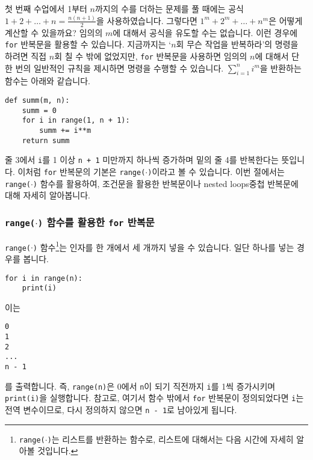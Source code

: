 \documentclass[../main.tex]{subfiles}
\begin{document}
첫 번째 수업에서 1부터 $n$까지의 수를 더하는 문제를 풀 때에는 공식
$1 + 2 + \dots + n = \frac{n(n + 1)}{2}$을 사용하였습니다.
그렇다면 $1^m + 2^m + \dots + n^m$은 어떻게 계산할 수 있을까요?
임의의 $m$에 대해서 공식을 유도할 수는 없습니다.
이런 경우에 \texttt{for} 반복문을 활용할 수 있습니다.
지금까지는 `$n$회 무슨 작업을 반복하라'의 명령을 하려면 직접 $n$회 칠 수 밖에 없었지만,  \texttt{for} 반복문을 사용하면 임의의 $n$에 대해서 단 한 번의 일반적인 규칙을 제시하면 명령을 수행할 수 있습니다.
$\sum_{i = 1}^n i^m$을 반환하는 함수는 아래와 같습니다.
\begin{verbatim}
def summ(m, n):
    summ = 0
    for i in range(1, n + 1):
        summ += i**m
    return summ
\end{verbatim}
줄 3에서 \texttt{i}를 1 이상 \texttt{n + 1} 미만까지 하나씩 증가하며 밑의 줄 4를 반복한다는 뜻입니다.
이처럼 \texttt{for} 반복문의 기본은 \texttt{range($\cdot$)}이라고 볼 수 있습니다.
이번 절에서는 \texttt{range($\cdot$)} 함수를 활용하여, 조건문을 활용한 반복문이나 nested loops중첩 반복문에 대해 자세히 알아봅니다.

\subsubsection{\texttt{range($\cdot$)} 함수를 활용한 \texttt{for} 반복문}
\texttt{range($\cdot$)} 함수\footnote{\texttt{range($\cdot$)}는 리스트를 반환하는 함수로, 리스트에 대해서는 다음 시간에 자세히 알아볼 것입니다.}는 인자를 한 개에서 세 개까지 넣을 수 있습니다.
일단 하나를 넣는 경우를 봅니다.
\begin{verbatim}
for i in range(n):
    print(i)
\end{verbatim}
이는 
\begin{verbatim}
0
1
2
...
n - 1
\end{verbatim}
를 출력합니다.
즉, \texttt{range(n)}은 0에서 \texttt{n}이 되기 직전까지 \texttt{i}를 1씩
증가시키며 \texttt{print(i)}을 실행합니다.
참고로, 여기서 함수 밖에서 \texttt{for} 반복문이 정의되었다면 \texttt{i}는 전역 변수이므로, 다시 정의하지 않으면 \texttt{n - 1}로 남아있게 됩니다.
\end{document}
